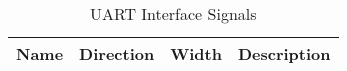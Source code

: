 \begin{table}[H]
  \centering
  \begin{tabular}{|l|l|r|p{8.5cm}|}
    
    \hline
    \rowcolor{iob-green}
    {\bf Name} & {\bf Direction} & {\bf Width} & {\bf Description}  \\ \hline \hline

    
 
  \end{tabular}
  \caption{UART Interface Signals}
  \label{uart_is_tab:is}
\end{table}

